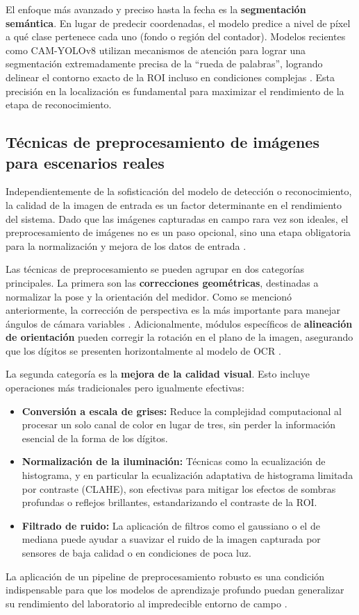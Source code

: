 El enfoque más avanzado y preciso hasta la fecha es la \textbf{segmentación semántica}. En lugar de predecir coordenadas, el modelo predice a nivel de píxel a qué clase pertenece cada uno (fondo o región del contador). Modelos recientes como CAM-YOLOv8 utilizan mecanismos de atención para lograr una segmentación extremadamente precisa de la ``rueda de palabras'', logrando delinear el contorno exacto de la ROI incluso en condiciones complejas \parencite{Wang2025}. Esta precisión en la localización es fundamental para maximizar el rendimiento de la etapa de reconocimiento.

\subsection{Técnicas de preprocesamiento de imágenes para escenarios reales}
\label{ssec:preprocessing_techniques}

Independientemente de la sofisticación del modelo de detección o reconocimiento, la calidad de la imagen de entrada es un factor determinante en el rendimiento del sistema. Dado que las imágenes capturadas en campo rara vez son ideales, el preprocesamiento de imágenes no es un paso opcional, sino una etapa obligatoria para la normalización y mejora de los datos de entrada \parencite{Zou2021}.

Las técnicas de preprocesamiento se pueden agrupar en dos categorías principales. La primera son las \textbf{correcciones geométricas}, destinadas a normalizar la pose y la orientación del medidor. Como se mencionó anteriormente, la corrección de perspectiva es la más importante para manejar ángulos de cámara variables \parencite{Peng2023Deep}. Adicionalmente, módulos específicos de \textbf{alineación de orientación} pueden corregir la rotación en el plano de la imagen, asegurando que los dígitos se presenten horizontalmente al modelo de OCR \parencite{Hong2021ImageBased}.

La segunda categoría es la \textbf{mejora de la calidad visual}. Esto incluye operaciones más tradicionales pero igualmente efectivas:
\begin{itemize}
    \item \textbf{Conversión a escala de grises:} Reduce la complejidad computacional al procesar un solo canal de color en lugar de tres, sin perder la información esencial de la forma de los dígitos.
    \item \textbf{Normalización de la iluminación:} Técnicas como la ecualización de histograma, y en particular la ecualización adaptativa de histograma limitada por contraste (CLAHE), son efectivas para mitigar los efectos de sombras profundas o reflejos brillantes, estandarizando el contraste de la ROI.
    \item \textbf{Filtrado de ruido:} La aplicación de filtros como el gaussiano o el de mediana puede ayudar a suavizar el ruido de la imagen capturada por sensores de baja calidad o en condiciones de poca luz.
\end{itemize}
La aplicación de un pipeline de preprocesamiento robusto es una condición indispensable para que los modelos de aprendizaje profundo puedan generalizar su rendimiento del laboratorio al impredecible entorno de campo \parencite{Chaki2019Automation}.

